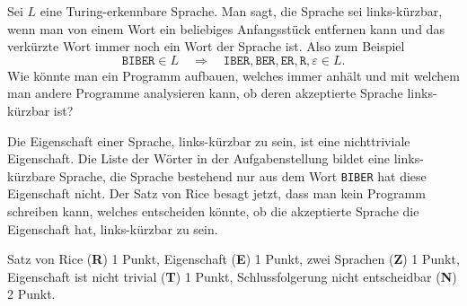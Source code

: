 Sei $L$ eine Turing-erkennbare Sprache.
Man sagt, die Sprache sei links-kürzbar, wenn man von einem Wort ein beliebiges
Anfangsstück entfernen kann und das verkürzte Wort immer noch ein Wort
der Sprache ist.
Also zum Beispiel
\[
\texttt{BIBER}\in L
\quad\Rightarrow\quad
\texttt{IBER},
\texttt{BER},
\texttt{ER},
\texttt{R},
\varepsilon \in L.
\]
Wie könnte man ein Programm aufbauen, welches immer anhält und mit
welchem man andere Programme analysieren kann, ob deren akzeptierte Sprache
links-kürzbar ist?


\begin{loesung}
Die Eigenschaft einer Sprache, links-kürzbar zu sein, ist eine nichttriviale 
Eigenschaft.
Die Liste der Wörter in der Aufgabenstellung bildet eine links-kürzbare
Sprache, die Sprache bestehend nur aus dem Wort \texttt{BIBER} hat diese
Eigenschaft nicht.
Der Satz von Rice besagt jetzt, dass man kein Programm schreiben kann, welches
entscheiden könnte, ob die akzeptierte Sprache die Eigenschaft hat,
links-kürzbar zu sein.
\end{loesung}

\begin{bewertung}
Satz von Rice ({\bf R}) 1 Punkt,
Eigenschaft ({\bf E}) 1 Punkt,
zwei Sprachen ({\bf Z}) 1 Punkt,
Eigenschaft ist nicht trivial ({\bf T}) 1 Punkt,
Schlussfolgerung nicht entscheidbar ({\bf N}) 2 Punkt.
\end{bewertung}




